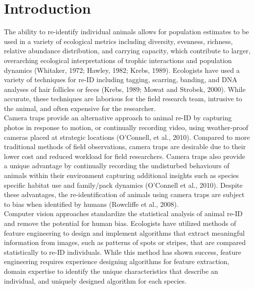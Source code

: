 \documentclass[11pt]{article}
\begin{document}
\section*{Introduction}

The ability to re-identify individual animals allows for population estimates to be used in a variety of ecological metrics including diversity, evenness, richness, relative abundance distribution, and carrying capacity, which contribute to larger, overarching ecological interpretations of trophic interactions and population dynamics (Whitaker, 1972; Hawley, 1982; Krebs, 1989). Ecologists have used a variety of techniques for re-ID including tagging, scarring, banding, and DNA analyses of hair follicles or feces (Krebs, 1989; Mowat and Strobek, 2000). While accurate, these techniques are laborious for the field research team, intrusive to the animal, and often expensive for the researcher.
\newline
\\
Camera traps provide an alternative approach to animal re-ID by capturing photos in response to motion, or continually recording video, using weather-proof cameras placed at strategic locations (O'Connell, et al., 2010). Compared to more traditional methods of field observations, camera traps are desirable due to their lower cost and reduced workload for field researchers. Camera traps also provide a unique advantage by continually recording the undisturbed behaviours of animals within their environment capturing additional insights such as species specific habitat use and family/pack dynamics (O'Connell et al., 2010). Despite these advantages, the re-identification of animals using camera traps are subject to bias when identified by humans (Rowcliffe et al., 2008). 
\newline
\\
Computer vision approaches standardize the statistical analysis of animal re-ID and remove the potential for human bias. Ecologists have utilized methods of feature engineering to design and implement algorithms that extract meaningful information from images, such as patterns of spots or stripes, that are compared statistically to re-ID individuals. While this method has shown success, feature engineering requires experience designing algorithms for feature extraction, domain expertise to identify the unique characteristics that describe an individual, and uniquely designed algorithm for each species. 
\newline
\\ 
\end{document}
